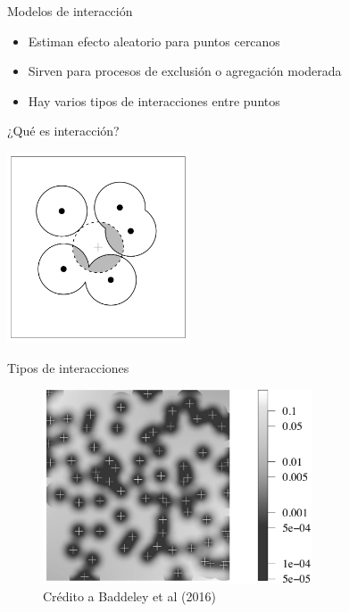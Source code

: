 \documentclass[
  11pt,
  ignorenonframetext,
]{beamer}
\providecommand{\tightlist}{%
  \setlength{\itemsep}{0pt}\setlength{\parskip}{0pt}}
\begin{document}
\begin{frame}{Modelos de interacción}
\protect\hypertarget{modelos-de-interacciuxf3n}{}
\begin{itemize}
\tightlist
\item
  Estiman efecto aleatorio para puntos cercanos
\item
  Sirven para procesos de exclusión o agregación moderada
\item
  Hay varios tipos de interacciones entre puntos
\end{itemize}
\end{frame}

\begin{frame}{¿Qué es interacción?}
\protect\hypertarget{quuxe9-es-interacciuxf3n}{}
\begin{center}\includegraphics[width=2.12in]{Figuras/Interaccion-puntos} \end{center}
\end{frame}

\begin{frame}{Tipos de interacciones}
\protect\hypertarget{tipos-de-interacciones}{}
\begin{figure}

{\centering \includegraphics[width=3.15in]{Figuras/Tipos-interacciones} 

}

\caption{Crédito a Baddeley et al (2016)}\label{fig:unnamed-chunk-27}
\end{figure}
\end{frame}
\end{document}
